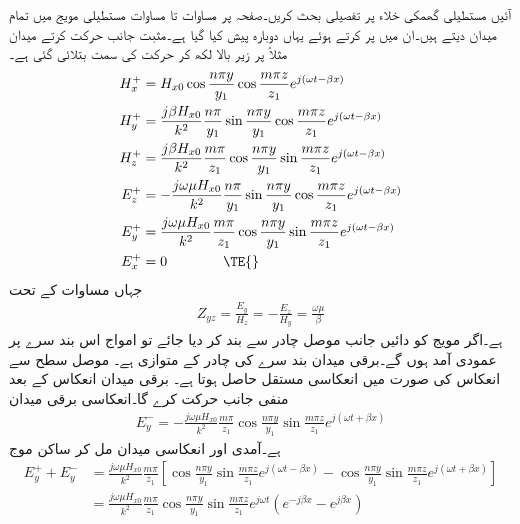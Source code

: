 آئیں مستطیلی گھمکی خلاء پر تفصیلی بحث کریں۔صفحہ  پر مساوات  تا مساوات  مستطیلی مویج میں تمام  میدان دیتے ہیں۔ان میں  پر کرتے ہوئے یہاں دوبارہ پیش کیا گیا ہے۔مثبت  جانب حرکت کرتے میدان مثلاً  پر زیر بالا  لکھ کر حرکت کی سمت بتلائی گئی ہے۔
 \begin{align}
H_x^{+}&=H_{x0} \cos \frac{n \pi y}{y_1}  \cos  \frac{m \pi z}{z_1} e^{j (\omega t -\beta x)}\\
H_y^{+}&=\frac{j \beta H_{x0}}{k^2}\frac{n \pi}{y_1} \sin \frac{n\pi y}{y_1} \cos \frac{m \pi z}{z_1} e^{j (\omega t -\beta x)} \\
H_z^{+}&=\frac{j \beta H_{x0}}{k^2}\frac{m \pi}{z_1} \cos \frac{n\pi y}{y_1} \sin \frac{m \pi z}{z_1} e^{j (\omega t -\beta x)}\\
E_z^{+}&=-\frac{j \omega \mu H_{x0}}{k^2}\frac{n \pi}{y_1} \sin \frac{n\pi y}{y_1} \cos \frac{m \pi z}{z_1} e^{j (\omega t -\beta x)}\\
E_y^{+}&=\frac{j \omega \mu H_{x0}}{k^2}\frac{m \pi}{z_1}\cos \frac{n\pi y}{y_1} \sin \frac{m \pi z}{z_1} e^{j (\omega t -\beta x)}\\
E_x^{+}&=0 \quad \quad \quad \quad \TE{}
\end{align}
جہاں مساوات  کے تحت
\begin{align}
Z_{yz}=\frac{E_y}{H_z}=-\frac{E_z}{H_y}=\frac{\omega \mu}{\beta}
\end{align}
ہے۔اگر مویج کو دائیں جانب موصل چادر سے بند کر دیا جائے تو امواج اس بند سرے پر عمودی آمد ہوں گے۔برقی میدان  بند سرے کی چادر کے متوازی ہے۔ موصل سطح سے انعکاس کی صورت میں انعکاسی مستقل  حاصل ہوتا ہے۔ برقی میدان انعکاس کے بعد منفی  جانب حرکت کرے گا۔انعکاسی برقی میدان
\begin{align}
E_y^{-}=-\frac{j \omega \mu H_{x0}}{k^2}\frac{m \pi}{z_1}\cos \frac{n\pi y}{y_1} \sin \frac{m \pi z}{z_1} e^{j (\omega t +\beta x)}
\end{align} 
ہے۔آمدی اور انعکاسی میدان مل کر ساکن موج
\begin{align*}
E_y^{+}+E_y^{-}&=\frac{j \omega \mu  H_{x0}}{k^2}\frac{m \pi}{z_1}\left[\cos \frac{n\pi y}{y_1} \sin \frac{m \pi z}{z_1} e^{j (\omega t -\beta x)}-\cos \frac{n\pi y}{y_1} \sin \frac{m \pi z}{z_1} e^{j (\omega t +\beta x)}\right]\\
&=\frac{j \omega \mu H_{x0}}{k^2}\frac{m \pi}{z_1}\cos \frac{n\pi y}{y_1} \sin \frac{m \pi z}{z_1}e^{j\omega t} \left(e^{-j\beta  x} - e^{j \beta x}\right)
\end{align*}
